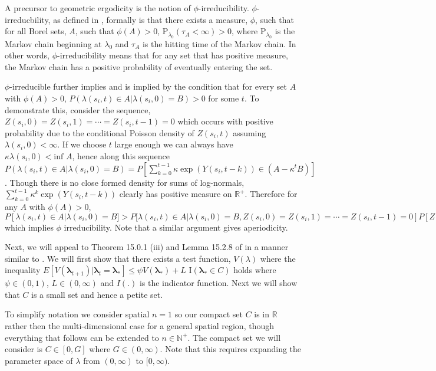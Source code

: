 \documentclass[11pt]{isuthesis}
\begin{document}
A precursor to geometric ergodicity is the notion of $\phi$-irreducibility.  $\phi$-irreducbility, as defined in \cite{meyn2012markov}, formally is that there exists a measure, $\phi$, such that for all Borel sets, $A$, such that $\phi(A)>0$, $\mbox{P}_{\lambda_0}(\tau_A<\infty)>0$, where $\mbox{P}_{\lambda_0}$ is the Markov chain beginning at $\lambda_0$ and $\tau_A$ is the hitting time of the Markov chain.  In other words, $\phi$-irreducibility means that for any set that has positive measure, the Markov chain has a positive probability of eventually entering the set.

$\phi$-irreducible further implies and is implied by the condition that for every set $A$ with $\phi(A)>0$, $P(\lambda(s_i,t)\in A|\lambda(s_i,0)=B)>0$ for some $t$.  
To demonstrate this, consider the sequence, $Z(s_i,0)=Z(s_i,1)=\cdots=Z(s_i,t-1)=0$ which occurs with positive probability due to the conditional Poisson density of $Z(s_i,t)$ assuming $\lambda(s_i,0)<\infty$.  If we choose $t$ large enough we can always have $\kappa\lambda(s_i,0) < \mbox{inf } A$, hence along this sequence $P(\lambda(s_i,t)\in A|\lambda(s_i,0)=B)= P[\sum_{k=0}^{t-1} \kappa\exp(Y(s_i,t-k))\in (A-\kappa^t B)]$.  Though there is no close formed density for sums of log-normals, $\sum_{k=0}^{t-1} \kappa^k\exp(Y(s_i,t-k))$ clearly has positive measure on $\mathbb{R}^{+}$.  Therefore for any $A$ with $\phi(A)>0$, $P[\lambda(s_i,t)\in A|\lambda(s_i,0)=B]>P[\lambda(s_i,t)\in A|\lambda(s_i,0)=B,Z(s_i,0)=Z(s_i,1)=\cdots=Z(s_i,t-1)=0]P[Z(s_i,0)=Z(s_i,1)=\cdots=Z(s_i,t-1)=0]|\lambda(s_i,0)=B>0$ which implies $\phi$ irreducibility.  Note that a similar argument gives aperiodicity.

Next, we will appeal to Theorem 15.0.1 (iii) and Lemma 15.2.8 of \cite{meyn2012markov} in a manner similar to \cite{fokianos2009poisson}. We will first show that there exists a test function, $V(\lambda)$ where the inequality $E[V(\boldsymbol{\lambda}_{t+1})|\boldsymbol{\lambda}_t=\boldsymbol{\lambda_*}]\leq \psi V(\boldsymbol{\lambda_*})+L \mbox{ I}(\boldsymbol{\lambda_*} \in C)$ holds where $\psi \in (0,1)$, $L \in (0,\infty)$ and $I(.)$ is the indicator function.  Next we will show that $C$ is a small set and hence a petite set.

To simplify notation we consider spatial $n=1$ so our compact set $C$ is in $\mathbb{R}$ rather then the multi-dimensional case for a general spatial region, though everything that follows can be extended to $n\in\mathbb{N}^+$.  The compact set we will consider is $C \in [0,G]$ where  $G \in (0,\infty)$.  Note that this requires expanding the parameter space of $\lambda$ from $(0,\infty)$ to $[0,\infty)$.
\end{document}
